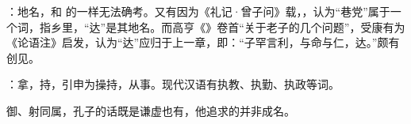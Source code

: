 {
\begin{lyblobitemize}
\item {}：地名，和  的一样无法确考。又有因为《礼记·曾子问》载，，认为“巷党”属于一个词，指乡里，“达”是其地名。而高亨《》卷首“关于老子的几个问题”，受康有为《论语注》启发，认为“达”应归于上一章，即：“子罕言利，与命与仁，达。”颇有创见。

\item {}：拿，持，引申为操持，从事。现代汉语有执教、执勤、执政等词。
\end{lyblobitemize}
御、射同属，孔子的话既是谦虚也有，他追求的并非成名。
}
{}


